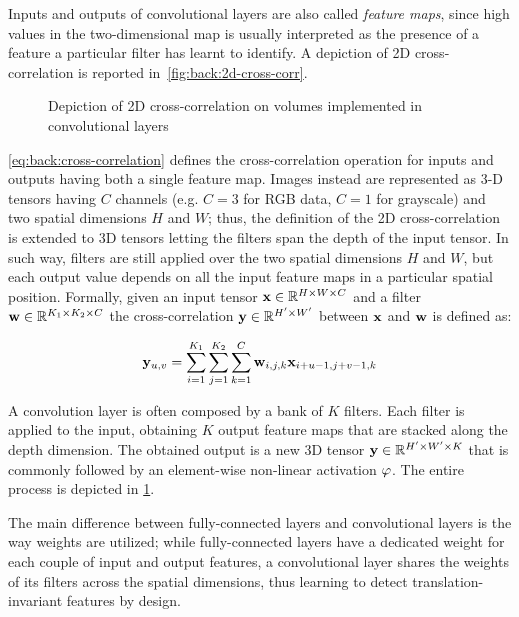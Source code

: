 Inputs and outputs of convolutional layers are also called \emph{feature maps}, since high values in the two-dimensional map is usually interpreted as the presence of a feature a particular filter has learnt to identify.
A depiction of 2D cross-correlation is reported in~\ref{fig:back:2d-cross-corr}.

\begin{figure}
    \centering
    \caption{Depiction of 2D cross-correlation on volumes implemented in convolutional layers}
    \label{fig:back:convolution}
\end{figure}

\ref{eq:back:cross-correlation} defines the cross-correlation operation for inputs and outputs having both a single feature map.
Images instead are represented as 3-D tensors having $C$ channels (e.g. $C=3$ for RGB data, $C=1$ for grayscale) and two spatial dimensions $H$ and $W$;
thus, the definition of the 2D cross-correlation is extended to 3D tensors letting the filters span the depth of the input tensor.
In such way, filters are still applied over the two spatial dimensions $H$ and $W$, but each output value depends on all the input feature maps in a particular spatial position.
Formally, given an input tensor $\mathbf{x} \in \mathbb{R}^{H \times W \times C}$ and a filter $\mathbf{w} \in \mathbb{R}^{K_1 \times K_2 \times C}$ the cross-correlation $\mathbf{y} \in \mathbb{R}^{H' \times W'}$ between $\mathbf{x}$ and $\mathbf{w}$ is defined as:

\begin{equation}\label{eq:back:channel-cross-correlation}
    \mathbf{y}_{u,v} = \sum_{i=1}^{K_1} \sum_{j=1}^{K_2} \sum_{k=1}^C \mathbf{w}_{i,j,k} \mathbf{x}_{i+u-1,j+v-1,k}
\end{equation}

A convolution layer is often composed by a bank of $K$ filters.
Each filter is applied to the input, obtaining $K$ output feature maps that are stacked along the depth dimension.
The obtained output is a new 3D tensor $\mathbf{y} \in \mathbb{R}^{H' \times W' \times K}$ that is commonly followed by an element-wise non-linear activation $\varphi$.
The entire process is depicted in \ref{fig:back:convolution}.

The main difference between fully-connected layers and convolutional layers is the way weights are utilized;
while fully-connected layers have a dedicated weight for each couple of input and output features, a convolutional layer shares the weights of its filters across the spatial dimensions, thus learning to detect translation-invariant features by design.

